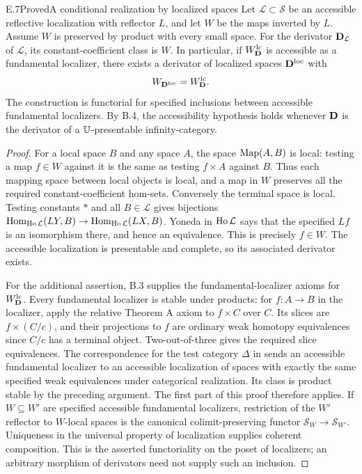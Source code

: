 \begin{claim}{E.7}{Proved}{A conditional realization by localized spaces}
Let $\mathcal L\subset\mathcal S$ be an accessible reflective
localization with reflector $L$, and let $W$ be the maps inverted by
$L$.  Assume $W$ is preserved by product with every small space.
For the derivator $\mathbf D_{\mathcal L}$ of $\mathcal L$, its
constant-coefficient class is $W$. In particular, if
$W_\mathbf D^{\mathrm{lc}}$ is accessible as a fundamental localizer,
there exists a derivator of localized spaces $\mathbf D^{\mathrm{loc}}$
with
\[
                 W_{\mathbf D^{\mathrm{loc}}}=W_\mathbf D^{\mathrm{lc}}.
\]
The construction is functorial for specified inclusions between
accessible fundamental localizers. By B.4, the accessibility
hypothesis holds whenever $\mathbf D$ is the derivator of a
$\mathbb U$-presentable infinity-category.
\end{claim}
\begin{proof}
For a local space $B$ and any space $A$, the space $\operatorname{Map}(A,B)$ is
local: testing a map $f\in W$ against it is the same as testing
$f\times A$ against $B$.  Thus each mapping space between local
objects is local, and a map in $W$ preserves all the required
constant-coefficient hom-sets.  Conversely the terminal space is
local.  Testing constants $*$ and all $B\in\mathcal L$ gives
bijections
$\operatorname{Hom}_{\operatorname{Ho}\mathcal L}(LY,B)\to
\operatorname{Hom}_{\operatorname{Ho}\mathcal L}(LX,B)$.
Yoneda in $\operatorname{Ho}\mathcal L$ says that the specified $Lf$ is an
isomorphism there, and hence an equivalence.  This is precisely
$f\in W$.  The accessible localization is presentable and complete,
so its associated derivator exists.

For the additional assertion, B.3 supplies the fundamental-localizer
axioms for $W_\mathbf D^{\mathrm{lc}}$. Every fundamental localizer is
stable under products: for $f:A\to B$ in the localizer, apply the
relative Theorem A axiom to $f\times C$ over $C$. Its slices are
$f\times(C/c)$, and their projections to $f$ are ordinary weak
homotopy equivalences since $C/c$ has a terminal object.
Two-out-of-three gives the required slice equivalences. The
correspondence for the test category $\Delta$ in
\citet[Theorems~4.2.15 and~1.4.3]{Cisinski2006} sends an accessible fundamental
localizer to an accessible localization of spaces with exactly the
same specified weak equivalences under categorical realization.
Its class is product stable by the preceding argument. The first
part of this proof therefore applies. If $W\subseteq W'$ are
specified accessible fundamental localizers, restriction of the
$W'$ reflector to $W$-local spaces is the canonical colimit-preserving
functor $\mathcal S_W\to\mathcal S_{W'}$. Uniqueness in the
universal property of localization supplies coherent composition.
This is the asserted functoriality on the poset of localizers;
an arbitrary morphism of derivators need not supply such an inclusion.
\end{proof}

